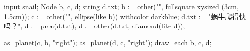 \usemodule[zhfonts]
\startMPpage
input snail;
Node b, c, d; string d.txt;
b := other("\CONTEXT", fullsquare xysized (3cm, 1.5cm));
c := other("\METAPOST", ellipse(like b)) withcolor darkblue;
d.txt := "蜗牛爬得快吗？";
d := proc(d.txt);
d := other(d.txt, diamond(like d));

as_planet(c, b, "right"); as_planet(d, c, "right");
draw_each b, c, d;
\stopMPpage
